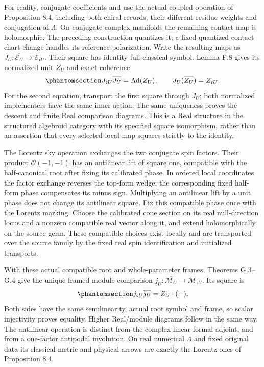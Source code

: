 \documentclass[
  english,
  11pt,
  reqno]{amsart}
\begin{document}
For reality, conjugate coefficients and use the actual coupled operation
of Proposition 8.4, including both chiral records, their different
residue weights and conjugation of \(\Lambda\). On conjugate complex
manifolds the remaining contact map is holomorphic. The preceding
construction quantizes it; a fixed quantized contact chart change
handles its reference polarization. Write the resulting maps as
\(J_U:\overline{\mathcal E_U}\to\mathcal E_{\mathfrak cU}\). Their
square has identity full classical symbol. Lemma F.8 gives its
normalized unit \(Z_U\) and exact coherence
\begin{equation}\protect\phantomsection\label{eq:gg-op-real-square}{
 J_{\mathfrak cU}\overline{J_U}
       =\operatorname{Ad}(Z_U),\qquad
 J_U(\overline{Z_U})=Z_{\mathfrak cU}.
}\end{equation} For the second equation, transport the first square
through \(J_U\); both normalized implementers have the same inner
action. The same uniqueness proves the descent and finite Real
comparison diagrams. This is a Real structure in the structured
algebroid category with its specified square isomorphism, rather than an
assertion that every selected local map squares strictly to the
identity.

The Lorentz sky operation exchanges the two conjugate spin factors.
Their product \(\mathcal O(-1,-1)\) has an antilinear lift of square
one, compatible with the half-canonical root after fixing its calibrated
phase. In ordered local coordinates the factor exchange reverses the
top-form wedge; the corresponding fixed half-form phase compensates its
minus sign. Multiplying an antilinear lift by a unit phase does not
change its antilinear square. Fix this compatible phase once with the
Lorentz marking. Choose the calibrated cone section on its real
null-direction locus and a nonzero compatible real vector along it, and
extend holomorphically on the source germ. These compatible choices
exist locally and are transported over the source family by the fixed
real spin identification and initialized transports.

With these actual compatible root and whole-parameter frames, Theorems
G.3--G.4 give the unique framed module comparison
\(j_U:\overline{\mathcal M_U}\to\mathcal M_{\mathfrak cU}\). Its square
is
\begin{equation}\protect\phantomsection\label{eq:gg-op-real-module-square}{
 j_{\mathfrak cU}\overline{j_U}=Z_U\cdot(-).
}\end{equation} Both sides have the same semilinearity, actual root
symbol and frame, so scalar injectivity proves equality. Higher
Real/module diagrams follow in the same way. The antilinear operation is
distinct from the complex-linear formal adjoint, and from a one-factor
antipodal involution. On real numerical \(\Lambda\) and fixed original
data its classical metric and physical arrows are exactly the Lorentz
ones of Proposition 8.4.
\end{document}
